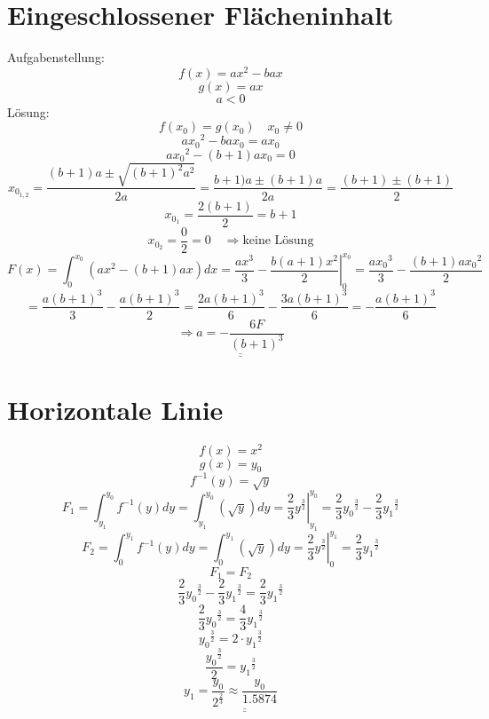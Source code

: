 \section{Eingeschlossener Flächeninhalt}
Aufgabenstellung: 
\[ f(x) = ax^2 - bax \]
\[ g(x) = ax \]
\[ a < 0 \]
Lösung: 
\[ f(x_0) = g(x_0) \quad x_0 \neq 0 \]
\[ a{x_0}^2 - bax_0 = ax_0 \]
\[ a{x_0}^2 - (b+1)ax_0 = 0 \]
\[ x_{0_{1,2}} = \frac{(b+1)a \pm \sqrt{(b+1)^2a^2}}{2a} = \frac{b+1)a \pm (b+1)a}{2a} = \frac{(b+1) \pm (b+1)}{2} \]
\[ x_{0_1} = \frac{2(b+1)}{2} = b+1 \]
\[ x_{0_2} = \frac{0}{2} = 0 \quad \Rightarrow \text{keine Lösung} \]
\[ F(x) = \int_0^{x_0} (ax^2 - (b+1)ax) dx = \left.\frac{ax^3}{3} - \frac{b(a+1)x^2}{2}\right|_0^{x_0} = \frac{a{x_0}^3}{3} - \frac{(b+1)a{x_0}^2}{2} \]
\[ = \frac{a{(b+1)}^3}{3} - \frac{a{(b+1)}^3}{2} = \frac{2a(b+1)^3}{6} - \frac{3a(b+1)^3}{6} = -\frac{a(b+1)^3}{6} \]
\[ \Rightarrow \underline{\underline{a = -\frac{6F}{(b+1)^3}}} \]

\section{Horizontale Linie}
\[ f(x) = x^2 \]
\[ g(x) = y_0 \]
\[ f^{-1}(y) = \sqrt{y} \]
\[ F_1 = \int_{y_1}^{y_0} f^{-1}(y) dy = \int_{y_1}^{y_0} \left(\sqrt{y}\right) dy = \left.\frac{2}{3} y^{\frac{3}{2}}\right|_{y_1}^{y_0} = \frac{2}{3}{y_0}^{\frac{3}{2}} - \frac{2}{3}{y_1}^{\frac{3}{2}} \]
\[ F_2 = \int_{0}^{y_1} f^{-1}(y) dy = \int_{0}^{y_1} \left(\sqrt{y}\right) dy = \left.\frac{2}{3} y^{\frac{3}{2}}\right|_{0}^{y_1} = \frac{2}{3}{y_1}^{\frac{3}{2}} \]
\[ F_1 = F_2 \]
\[ \frac{2}{3}{y_0}^{\frac{3}{2}} - \frac{2}{3}{y_1}^{\frac{3}{2}} = \frac{2}{3}{y_1}^{\frac{3}{2}} \]
\[ \frac{2}{3}{y_0}^{\frac{3}{2}} = \frac{4}{3}{y_1}^{\frac{3}{2}} \]
\[ {y_0}^{\frac{3}{2}} = 2 \cdot {y_1}^{\frac{3}{2}} \]
\[ \frac{{y_0}^{\frac{3}{2}}}{2} = {y_1}^{\frac{3}{2}} \]
\[ y_1 = \underline{\underline{\frac{y_0}{2^{\frac{2}{3}}} \approx \frac{y_0}{1.5874}}} \]


